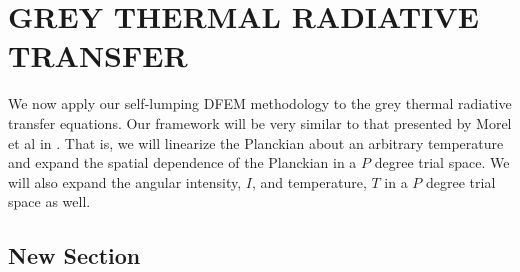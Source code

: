 %
%
%



\chapter{\uppercase{Grey Thermal Radiative Transfer}}
\label{sec:chapter6_grey_radtran}

We now apply our self-lumping DFEM methodology to the grey thermal radiative transfer equations.
Our framework will be very similar to that presented by Morel et al in \cite{morel_radtran}.
That is, we will linearize the Planckian about an arbitrary temperature and expand the spatial dependence of the Planckian in a $P$ degree trial space.
We will also expand the angular intensity, $I$, and temperature, $T$ in a $P$ degree trial space as well.

\section{New Section}

